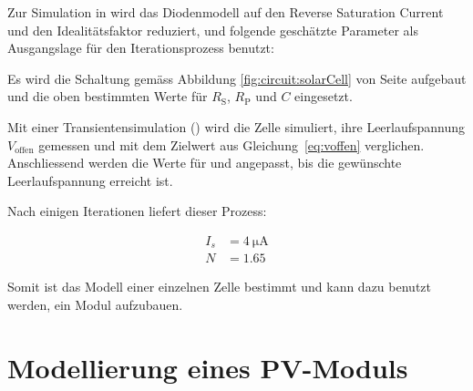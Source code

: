 
Zur  Simulation  in    wird das  Diodenmodell  auf  den  Reverse
Saturation  Current   und  den  Idealit\"atsfaktor  reduziert,   und  folgende
gesch\"atzte Parameter als Ausgangslage f\"ur den Iterationsprozess benutzt:

\begin{center}
\end{center}

Es wird die Schaltung gem\"ass Abbildung \ref{fig:circuit:solarCell} von Seite
\pageref{fig:circuit:solarCell} aufgebaut und die  oben bestimmten Werte f\"ur
$R_{\mathrm{S}}$, $R_{\mathrm{P}}$ und $C$ eingesetzt.

Mit einer  Transientensimulation () wird die  Zelle simuliert,
ihre  Leerlaufspannung  $V_{\mathrm{offen}}$  gemessen und  mit  dem  Zielwert
aus   Gleichung~\ref{eq:voffen}  verglichen.  Anschliessend  werden die  Werte f\"ur   und 
angepasst, bis die gew\"unschte Leerlaufspannung erreicht ist.

Nach einigen Iterationen liefert dieser Prozess\footnotemark:


\begin{align}
    \label{eq:cell:diode:IS:N:result}
    I_s &= \SI{4}{\micro\ampere} \\
    N   &= 1.65
\end{align}

Somit ist  das Modell  einer einzelnen  Zelle bestimmt  und kann  dazu benutzt
werden,  ein   Modul  aufzubauen.


\section{Modellierung eines PV-Moduls}
\label{sec:simu:model:module}


